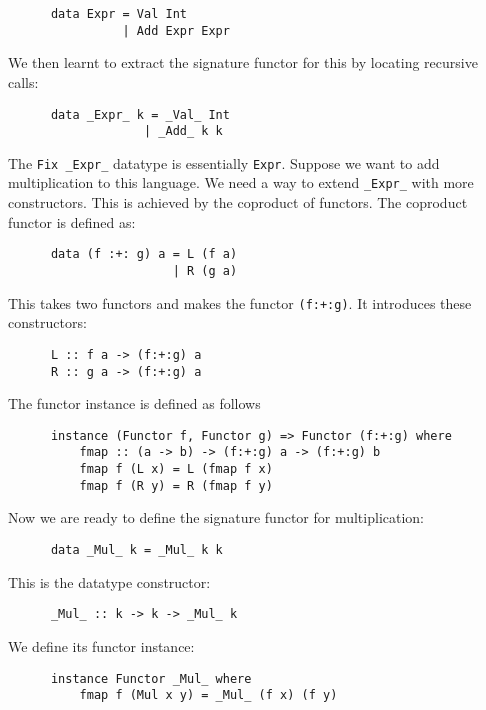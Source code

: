 \documentclass[a4paper,12pt]{article}
\theoremstyle{remark}
\begin{document}
  \begin{lstlisting}
      data Expr = Val Int
                | Add Expr Expr  \end{lstlisting}

  We then learnt to extract the signature functor for this by locating recursive calls:

  \begin{lstlisting}
      data _Expr_ k = _Val_ Int
                   | _Add_ k k  \end{lstlisting}

  The \lstinline{Fix _Expr_} datatype is essentially \lstinline{Expr}. Suppose we want to add multiplication
  to this language. We need a way to extend \lstinline{_Expr_} with more constructors. This is
  achieved by the coproduct of functors. The coproduct functor is defined as:

  \begin{lstlisting}
      data (f :+: g) a = L (f a)
                       | R (g a)  \end{lstlisting}

  This takes two functors and makes the functor \lstinline{(f:+:g)}. It introduces these
  constructors:

  \begin{lstlisting}
      L :: f a -> (f:+:g) a
      R :: g a -> (f:+:g) a  \end{lstlisting}

  The functor instance is defined as follows

  \begin{lstlisting}
      instance (Functor f, Functor g) => Functor (f:+:g) where
          fmap :: (a -> b) -> (f:+:g) a -> (f:+:g) b
          fmap f (L x) = L (fmap f x)
          fmap f (R y) = R (fmap f y)  \end{lstlisting}

  Now we are ready to define the signature functor for multiplication:

  \begin{lstlisting}
      data _Mul_ k = _Mul_ k k  \end{lstlisting}

  This is the datatype constructor:

  \begin{lstlisting}
      _Mul_ :: k -> k -> _Mul_ k  \end{lstlisting}

  We define its functor instance:

  \begin{lstlisting}
      instance Functor _Mul_ where
          fmap f (Mul x y) = _Mul_ (f x) (f y)  \end{lstlisting}
\end{document}
